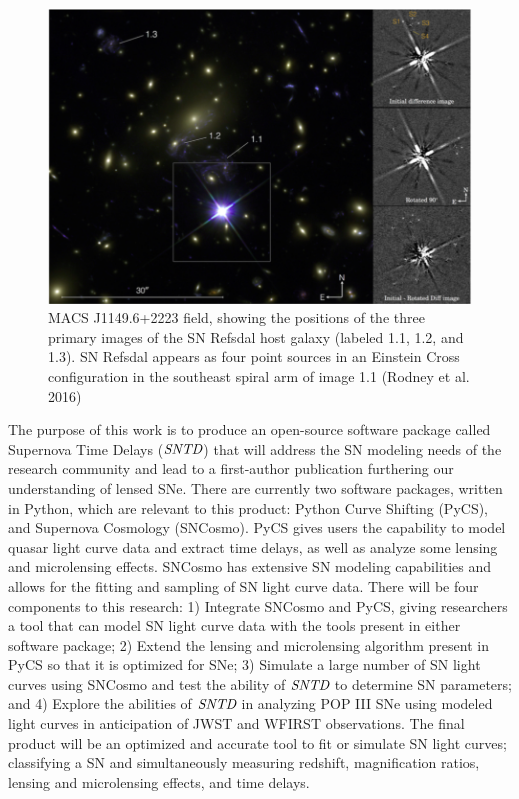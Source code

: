 \begin{figure}[h]
\centering
\includegraphics[scale=.25]{rodney_refs.png}
\caption{
MACS J1149.6+2223 field, showing the positions of the three primary
images of the SN Refsdal host galaxy (labeled 1.1, 1.2, and 1.3). SN
Refsdal appears as four point sources in an Einstein Cross
configuration in the southeast spiral arm of image 1.1 (Rodney et
al. 2016)}
\end{figure}


The purpose of this work is to produce an open-source software
package called Supernova Time Delays ($\textit{SNTD}$) that will
address the SN modeling needs of the research community and lead to a
first-author publication furthering our understanding of lensed
SNe. There are currently two software packages, written in Python,
which are relevant to this product: Python Curve Shifting (PyCS), and
Supernova Cosmology (SNCosmo). PyCS gives users the capability to
model quasar light curve data and extract time delays, as well as
analyze some lensing and microlensing effects. SNCosmo has extensive
SN modeling capabilities and allows for the fitting and sampling of SN
light curve data. There will be four components to this research: 1)
Integrate SNCosmo and PyCS, giving researchers a tool that can model
SN light curve data with the tools present in either software package;
2) Extend the lensing and microlensing algorithm present in PyCS so
that it is optimized for SNe; 3) Simulate a large number of SN light
curves using SNCosmo and test the ability of $\textit{SNTD}$ to
determine SN parameters; and 4) Explore the abilities of
$\textit{SNTD}$ in analyzing POP III SNe using modeled light curves in
anticipation of JWST and WFIRST observations. The final product will
be an optimized and accurate tool to fit or simulate SN light curves;
classifying a SN and simultaneously measuring redshift, magnification
ratios, lensing and microlensing effects, and time delays.


